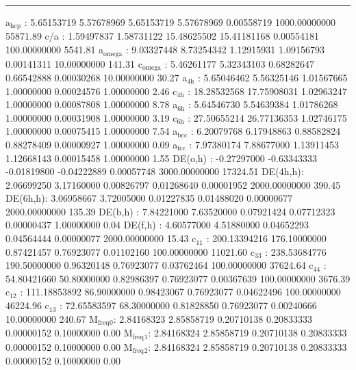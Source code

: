 \documentclass[11pt]{article}
\begin{document}
\noindent\rule{\textwidth}{0.5pt}
a\(_{\text{hcp}}\)   :   5.65153719   5.57678969   5.65153719   5.57678969   0.00558719 1000.00000000     55871.89
c/a     :   1.59497837   1.58731122  15.48625502  15.41181168   0.00554181 100.00000000      5541.81
a\(_{\text{omega}}\) :   9.03327448   8.73254342   1.12915931   1.09156793   0.00141311  10.00000000       141.31
c\(_{\text{omega}}\) :   5.46261177   5.32343103   0.68282647   0.66542888   0.00030268  10.00000000        30.27
a\(_{\text{4h}}\)    :   5.65046462   5.56325146   1.01567665   1.00000000   0.00024576   1.00000000         2.46
c\(_{\text{4h}}\)    :  18.28532568  17.75908031   1.02963247   1.00000000   0.00087808   1.00000000         8.78
a\(_{\text{6h}}\)    :   5.64546730   5.54639384   1.01786268   1.00000000   0.00031908   1.00000000         3.19
c\(_{\text{6h}}\)    :  27.50655214  26.77136353   1.02746175   1.00000000   0.00075415   1.00000000         7.54
a\(_{\text{bcc}}\)   :   6.20079768   6.17948863   0.88582824   0.88278409   0.00000927   1.00000000         0.09
a\(_{\text{fcc}}\)   :   7.97380174   7.88677000   1.13911453   1.12668143   0.00015458   1.00000000         1.55
DE(o,h) :  -0.27297000  -0.63343333  -0.01819800  -0.04222889   0.00057748 3000.00000000     17324.51
DE(4h,h):   2.06699250   3.17160000   0.00826797   0.01268640   0.00001952 2000.00000000       390.45
DE(6h,h):   3.06958667   3.72005000   0.01227835   0.01488020   0.00000677 2000.00000000       135.39
DE(b,h) :   7.84221000   7.63520000   0.07921424   0.07712323   0.00000437   1.00000000         0.04
DE(f,h) :   4.60577000   4.51880000   0.04652293   0.04564444   0.00000077 2000.00000000        15.43
c\(_{\text{11}}\)    : 200.13394216 176.10000000   0.87421457   0.76923077   0.01102160 100.00000000     11021.60
c\(_{\text{33}}\)    : 238.53684776 190.50000000   0.96320148   0.76923077   0.03762464 100.00000000     37624.64
c\(_{\text{44}}\)    :  54.80421660  50.80000000   0.82986397   0.76923077   0.00367639 100.00000000      3676.39
c\(_{\text{12}}\)    : 111.18853892  86.90000000   0.98423067   0.76923077   0.04622496 100.00000000     46224.96
c\(_{\text{13}}\)    :  72.65583597  68.30000000   0.81828850   0.76923077   0.00240666  10.00000000       240.67
M\(_{\text{freq}}\)\(_{\text{0}}\):   2.84168323   2.85858719   0.20710138   0.20833333   0.00000152   0.10000000         0.00
M\(_{\text{freq}}\)\(_{\text{1}}\):   2.84168324   2.85858719   0.20710138   0.20833333   0.00000152   0.10000000         0.00
M\(_{\text{freq}}\)\(_{\text{2}}\):   2.84168324   2.85858719   0.20710138   0.20833333   0.00000152   0.10000000         0.00
\end{document}
